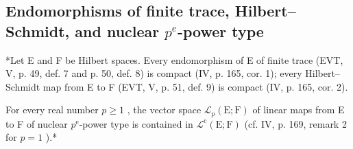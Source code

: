 \subsection{\texorpdfstring{Endomorphisms of finite trace, Hilbert--Schmidt, and nuclear \(p^{e}\)-power type}{Endomorphisms of finite trace, Hilbert--Schmidt, and nuclear p\^{}\{e\}-power type}}

*Let E and F be Hilbert spaces. Every endomorphism of E of finite trace (EVT, V, p. 49, def. 7 and p. 50, def. 8) is compact (IV, p. 165, cor. 1); every Hilbert--Schmidt map from E to F (EVT, V, p. 51, def. 9) is compact (IV, p. 165, cor. 2).

For every real number \(p \geqslant 1\) , the vector space \(\mathcal{L}_{p}(\mathrm{E};\mathrm{F})\) of linear maps from E to F of nuclear \(p^{\mathrm{e}}\)-power type is contained in \(\mathcal{L}^{\mathrm{c}}(\mathrm{E};\mathrm{F})\) (cf. IV, p. 169, remark 2 for \(p = 1\) ).*

